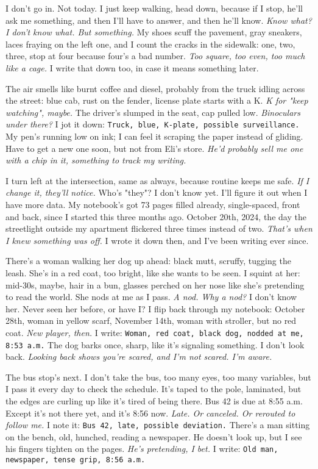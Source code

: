 \documentclass[12pt,oneside]{book} %
\newcommand{\note}[1]{\texttt{#1}}
\begin{document}
I don’t go in. Not today. I just keep walking, head down, because if I stop, he’ll ask me something, and then I’ll have to answer, and then he’ll know. \textit{Know what? I don’t know what. But something.} My shoes scuff the pavement, gray sneakers, laces fraying on the left one, and I count the cracks in the sidewalk: one, two, three, stop at four because four’s a bad number. \textit{Too square, too even, too much like a cage.} I write that down too, in case it means something later.

The air smells like burnt coffee and diesel, probably from the truck idling across the street: blue cab, rust on the fender, license plate starts with a K. \textit{K for "keep watching", maybe.} The driver’s slumped in the seat, cap pulled low. \textit{Binoculars under there?} I jot it down: \note{Truck, blue, K-plate, possible surveillance.} My pen’s running low on ink; I can feel it scraping the paper instead of gliding. Have to get a new one soon, but not from \textnormal{Eli}’s store. \textit{He’d probably sell me one with a chip in it, something to track my writing.}

I turn left at the intersection, same as always, because routine keeps me safe. \textit{If I change it, they’ll notice.} Who’s "they"? I don’t know yet. I’ll figure it out when I have more data. My notebook’s got 73 pages filled already, single-spaced, front and back, since I started this three months ago. October 20th, 2024, the day the streetlight outside my apartment flickered three times instead of two. \textit{That’s when I knew something was off.} I wrote it down then, and I’ve been writing ever since.

There’s a woman walking her dog up ahead: black mutt, scruffy, tugging the leash. She’s in a red coat, too bright, like she wants to be seen. I squint at her: mid-30s, maybe, hair in a bun, glasses perched on her nose like she’s pretending to read the world. She nods at me as I pass. \textit{A nod. Why a nod?} I don’t know her. Never seen her before, or have I? I flip back through my notebook: October 28th, woman in yellow scarf, November 14th, woman with stroller, but no red coat. \textit{New player, then.} I write: \note{Woman, red coat, black dog, nodded at me, 8:53 a.m.} The dog barks once, sharp, like it’s signaling something. I don’t look back. \textit{Looking back shows you’re scared, and I’m not scared. I’m aware.}

The bus stop’s next. I don’t take the bus, too many eyes, too many variables, but I pass it every day to check the schedule. It’s taped to the pole, laminated, but the edges are curling up like it’s tired of being there. Bus 42 is due at 8:55 a.m. Except it’s not there yet, and it’s 8:56 now. \textit{Late. Or canceled. Or rerouted to follow me.} I note it: \note{Bus 42, late, possible deviation.} There’s a man sitting on the bench, old, hunched, reading a newspaper. He doesn’t look up, but I see his fingers tighten on the pages. \textit{He’s pretending, I bet.} I write: \note{Old man, newspaper, tense grip, 8:56 a.m.}
\end{document}
